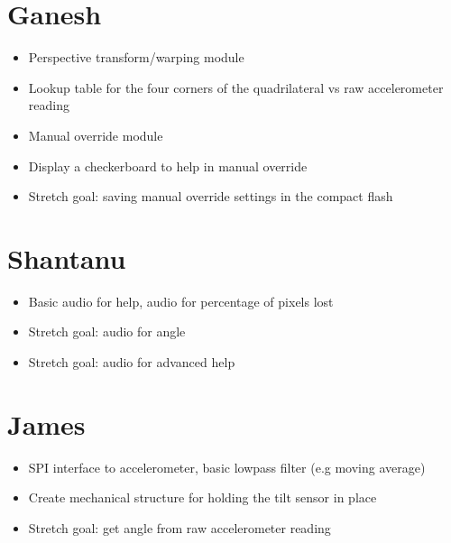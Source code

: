 \documentclass{article}
\begin{document}
\maketitle

\section{Ganesh}
\begin{itemize}
    \item Perspective transform/warping module
    \item Lookup table for the four corners of the quadrilateral vs raw accelerometer reading
    \item Manual override module
    \item Display a checkerboard to help in manual override
    \item Stretch goal: saving manual override settings in the compact flash
\end{itemize}

\section{Shantanu}
\begin{itemize}
    \item Basic audio for help, audio for percentage of pixels lost
    \item Stretch goal: audio for angle
    \item Stretch goal: audio for advanced help
\end{itemize}

\section{James}
\begin{itemize}
    \item SPI interface to accelerometer, basic lowpass filter (e.g moving average)
    \item Create mechanical structure for holding the tilt sensor in place
    \item Stretch goal: get angle from raw accelerometer reading
\end{itemize}
\end{document}
